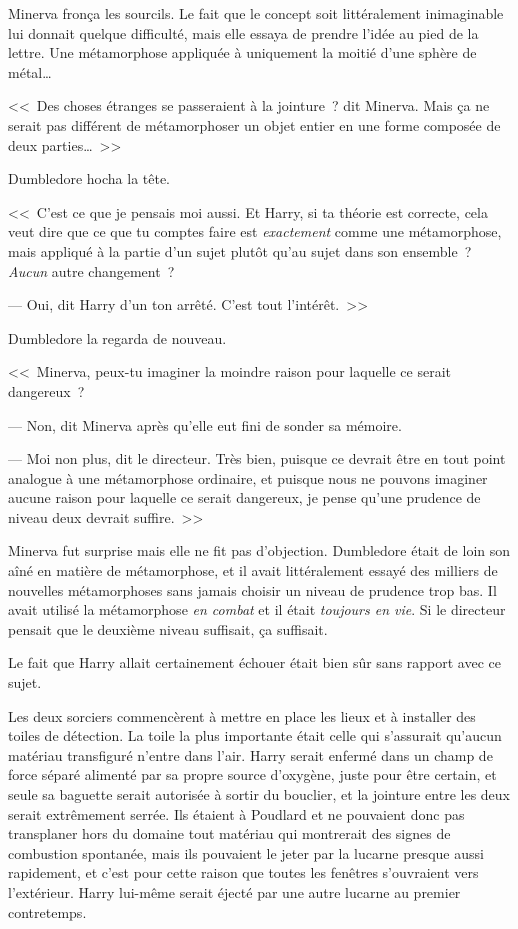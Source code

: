 Minerva fronça les sourcils. Le fait que le concept soit littéralement inimaginable lui donnait quelque difficulté, mais elle essaya de prendre l'idée au pied de la lettre. Une métamorphose appliquée à uniquement la moitié d'une sphère de métal…

<<~Des choses étranges se passeraient à la jointure~? dit Minerva. Mais ça ne serait pas différent de métamorphoser un objet entier en une forme composée de deux parties…~>>

Dumbledore hocha la tête.

<<~C'est ce que je pensais moi aussi. Et Harry, si ta théorie est correcte, cela veut dire que ce que tu comptes faire est \emph{exactement} comme une métamorphose, mais appliqué à la partie d'un sujet plutôt qu'au sujet dans son ensemble~? \emph{Aucun} autre changement~?

--- Oui, dit Harry d'un ton arrêté. C'est tout l'intérêt.~>>

Dumbledore la regarda de nouveau.

<<~Minerva, peux-tu imaginer la moindre raison pour laquelle ce serait dangereux~?

--- Non, dit Minerva après qu'elle eut fini de sonder sa mémoire.

--- Moi non plus, dit le directeur. Très bien, puisque ce devrait être en tout point analogue à une métamorphose ordinaire, et puisque nous ne pouvons imaginer aucune raison pour laquelle ce serait dangereux, je pense qu'une prudence de niveau deux devrait suffire.~>>

Minerva fut surprise mais elle ne fit pas d'objection. Dumbledore était de loin son aîné en matière de métamorphose, et il avait littéralement essayé des milliers de nouvelles métamorphoses sans jamais choisir un niveau de prudence trop bas. Il avait utilisé la métamorphose \emph{en combat} et il était \emph{toujours en vie}. Si le directeur pensait que le deuxième niveau suffisait, ça suffisait.

Le fait que Harry allait certainement échouer était bien sûr sans rapport avec ce sujet.

Les deux sorciers commencèrent à mettre en place les lieux et à installer des toiles de détection. La toile la plus importante était celle qui s'assurait qu'aucun matériau transfiguré n'entre dans l'air. Harry serait enfermé dans un champ de force séparé alimenté par sa propre source d'oxygène, juste pour être certain, et seule sa baguette serait autorisée à sortir du bouclier, et la jointure entre les deux serait extrêmement serrée. Ils étaient à Poudlard et ne pouvaient donc pas transplaner hors du domaine tout matériau qui montrerait des signes de combustion spontanée, mais ils pouvaient le jeter par la lucarne presque aussi rapidement, et c'est pour cette raison que toutes les fenêtres s'ouvraient vers l'extérieur. Harry lui-même serait éjecté par une autre lucarne au premier contretemps.

